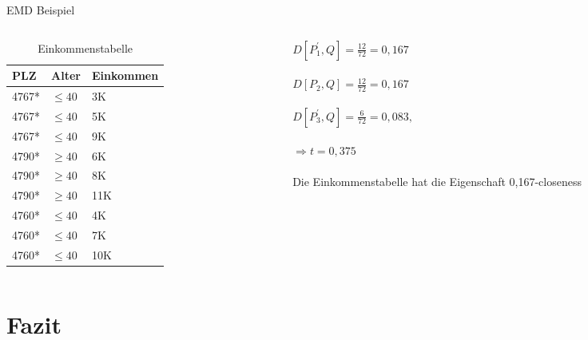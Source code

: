 \begin{frame} {EMD Beispiel}
	
	\begin{columns}[T]
		\begin{column}{0.5\textwidth}
			\begin{table}[]
				\centering
				\label{tclossenessExample}
				\begin{tabular}{|l|l|l|}
					\hline
					\textbf{PLZ}   & \textbf{Alter}    & \textbf{Einkommen} \\\hline
					4767* & $\le 40$ & 3K \\
					4767* & $\le 40$ & 5K \\
					4767* & $\le 40$ & 9K \\\hline
					4790* & $\ge 40$ & 6K \\
					4790* & $\ge 40$ & 8K \\
					4790* & $\ge 40$ & 11K \\\hline
					4760* & $\le 40$ & 4K \\
					4760* & $\le 40$ & 7K \\
					4760* & $\le 40$ & 10K \\\hline
				\end{tabular}
				\caption{Einkommenstabelle}
			\end{table}
		\end{column}
		
		\begin{column}{0.5\textwidth}
			$D[P_1^{'},Q]=\frac{12}{72} = 0,167$\\
			\ \\
			$D[P_2,Q]=\frac{12}{72} = 0,167$\\
			\ \\
			$D[P_3^{'},Q]=\frac{6}{72} = 0,083,$\\
			\ \\
			$\Rightarrow t=0,375$\\
			\ \\
			Die Einkommenstabelle hat die Eigenschaft 0,167-closeness	
		\end{column}
	\end{columns}

\end{frame}

\section{Fazit}

